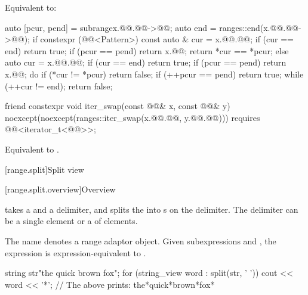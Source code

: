 \begin{itemdescr}
\pnum
\effects
Equivalent to:
\begin{codeblock}
auto [pcur, pend] = subrange{x.@@.@@->@@};
auto end = ranges::end(x.@@.@@->@@);
if constexpr (@@<Pattern>) {
  const auto & cur = x.@@.@@;
  if (cur == end) return true;
  if (pcur == pend) return x.@@;
  return *cur == *pcur;
} else {
  auto cur = x.@@.@@;
  if (cur == end) return true;
  if (pcur == pend) return x.@@;
  do {
    if (*cur != *pcur) return false;
    if (++pcur == pend) return true;
  } while (++cur != end);
  return false;
}
\end{codeblock}
\end{itemdescr}

%
\begin{itemdecl}
friend constexpr void iter_swap(const @@& x, const @@& y)
  noexcept(noexcept(ranges::iter_swap(x.@@.@@, y.@@.@@)))
  requires @@<iterator_t<@@>>;
\end{itemdecl}

\begin{itemdescr}
\pnum
\effects
Equivalent to
.
\end{itemdescr}

[range.split]{Split view}

[range.split.overview]{Overview}

\pnum
{} takes a  and a delimiter, and
splits the  into s on the delimiter.
The delimiter can be a single element or a  of elements.

\pnum
The name  denotes
a range adaptor object.
Given subexpressions  and ,
the expression  is expression-equivalent to
.

\pnum
\begin{example}
\begin{codeblock}
string str{"the quick brown fox"};
for (string_view word : split(str, ' ')) {
  cout << word << '*';
}
// The above prints: the*quick*brown*fox*
\end{codeblock}
\end{example}

